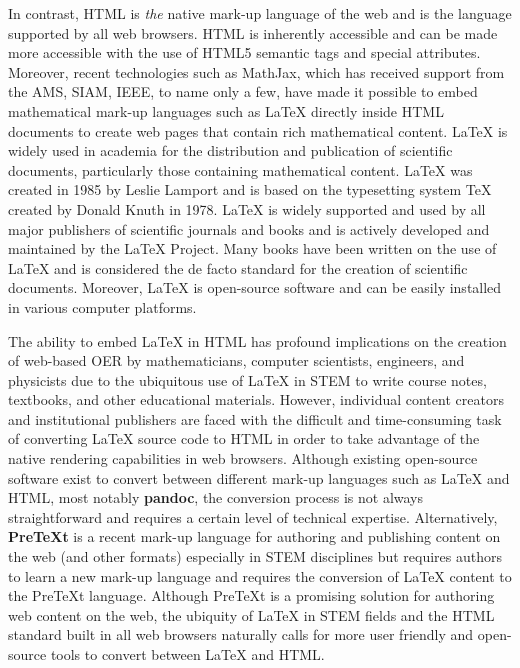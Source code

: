 \documentclass[11pt]{article}
\begin{document}
In contrast, HTML is \textit{the} native mark-up language of the web and is the language supported by all web browsers.  HTML is inherently accessible and can be made more accessible with the use of HTML5 semantic tags and special attributes.  Moreover, recent technologies such as MathJax, which has received support from the AMS, SIAM, IEEE, to name only a few, have made it possible to embed mathematical mark-up languages such as LaTeX directly inside HTML documents to create web pages that contain rich mathematical content.  LaTeX is widely used in academia for the distribution and publication of scientific documents, particularly those containing mathematical content.  LaTeX was created in 1985 by Leslie Lamport and is based on the typesetting system TeX created by Donald Knuth in 1978.  LaTeX is widely supported and used by all major publishers of scientific journals and books and is actively developed and maintained by the LaTeX Project.  Many books have been written on the use of LaTeX and is considered the de facto standard for the creation of scientific documents.  Moreover, LaTeX is open-source software and can be easily installed in various computer platforms.

The ability to embed LaTeX in HTML has profound implications on the creation of web-based OER  by mathematicians, computer scientists, engineers, and physicists due to the ubiquitous use of LaTeX in STEM to write course notes, textbooks, and other educational materials.  However, individual content creators and institutional publishers are faced with the difficult and time-consuming task of converting LaTeX source code to HTML in order to take advantage of the native rendering capabilities in web browsers.  Although existing open-source software exist to convert between different mark-up languages such as LaTeX and HTML, most notably \textbf{pandoc}, the conversion process is not always straightforward and requires a certain level of technical expertise.  Alternatively, \textbf{PreTeXt} is a recent mark-up language for authoring and publishing content on the web (and other formats) especially in STEM disciplines but requires authors to learn a new mark-up language and requires the conversion of LaTeX content  to the PreTeXt language.  Although PreTeXt is a promising solution for authoring web content on the web, the ubiquity of LaTeX in STEM fields and the HTML standard built in all web browsers naturally calls for more user friendly and open-source tools to convert between LaTeX and HTML.

\end{document}
